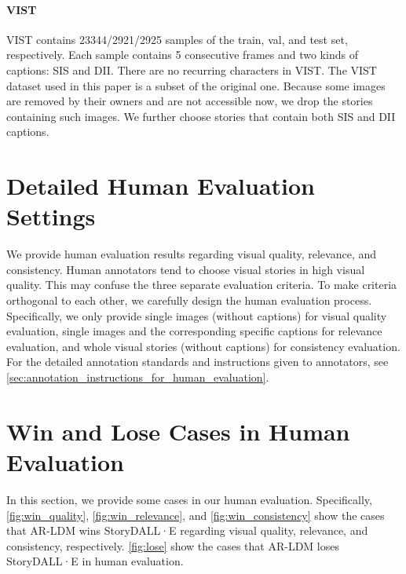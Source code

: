 \documentclass[10pt,twocolumn,letterpaper]{article}
\begin{document}
\paragraph{VIST}
VIST contains 23344/2921/2925 samples of the train, val, and test set, respectively. Each sample contains 5 consecutive frames and two kinds of captions: SIS and DII. There are no recurring characters in VIST. The VIST dataset used in this paper is a subset of the original one. Because some images are removed by their owners and are not accessible now, we drop the stories containing such images. We further choose stories that contain both SIS and DII captions.

\section{Detailed Human Evaluation Settings}
\label{sec:detailed_human_evaluation_settings}
We provide human evaluation results regarding visual quality, relevance, and consistency. Human annotators tend to choose visual stories in high visual quality. This may confuse the three separate evaluation criteria. To make criteria orthogonal to each other, we carefully design the human evaluation process. Specifically, we only provide single images (without captions) for visual quality evaluation, single images and the corresponding specific captions for relevance evaluation, and whole visual stories (without captions) for consistency evaluation. For the detailed annotation standards and instructions given to annotators, see \cref{sec:annotation_instructions_for_human_evaluation}.

\section{Win and Lose Cases in Human Evaluation}
\label{sec:win_and_lose_cases_in_human_evaluation}
In this section, we provide some cases in our human evaluation. Specifically, \cref{fig:win_quality}, \cref{fig:win_relevance}, and \cref{fig:win_consistency} show the cases that AR-LDM wins StoryDALL·E regarding visual quality, relevance, and consistency, respectively. \cref{fig:lose} show the cases that AR-LDM loses StoryDALL·E in human evaluation.
\end{document}
